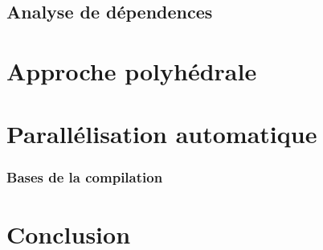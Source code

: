 \documentclass{beamer}
\begin{document}
\subsection{Analyse de dépendences}
\begin{frame}
\frametitle{}

\end{frame}

\section{Approche polyhédrale}
\begin{frame}
\frametitle{}

\end{frame}

\section{Parallélisation automatique}
\begin{frame}
\frametitle{}

\end{frame}

\begin{frame}
\frametitle{Bases de la compilation}
\framesubtitle{}

\end{frame}


\section{Conclusion}
\begin{frame}
\frametitle{}
\end{frame}
\end{document}
